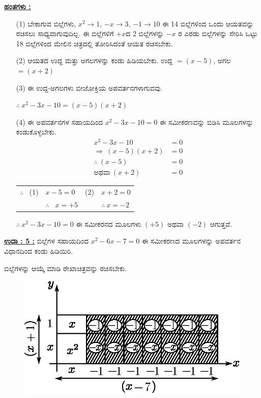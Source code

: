 \noindent
{\textbf{\underline{ಹಂತಗಳು :}}}
\begin{itemize}
\item [(1)] ಬೇಕಾಗುವ ಬಿಲ್ಲೆಗಳು, $x^2 \rightarrow 1$, $-x \rightarrow 3$, $-1 \rightarrow 10$ ಈ 14 ಬಿಲ್ಲೆ\break ಗಳಿಂದ ಒಂದು ಆಯತವನ್ನು ರಚಿಸಲು ಸಾಧ್ಯವಾಗುವುದಿಲ್ಲ. ಈ ಬಿಲ್ಲೆಗಳಿಗೆ $+x$ದ 2 ಬಿಲ್ಲೆಗಳನ್ನು  $-x$ ರ ಎರಡು ಬಿಲ್ಲೆಗಳನ್ನು  ಸೇರಿಸಿ ಒಟ್ಟು 18 ಬಿಲ್ಲೆಗಳಿಂದ ಮೇಲಿನ ಚಿತ್ರದಲ್ಲಿ ತೋರಿಸಿದಂತೆ ಆಯತ ರಚಿಸಬೇಕು. 
\item [(2)] ಆಯತದ ಉದ್ದ ಮತ್ತು ಅಗಲಗಳನ್ನು ಕಂಡು ಹಿಡಿಯಬೇಕು. ಉದ್ದ $= (x - 5)$, ಅಗಲ $= (x + 2)$

\eject

\item [(3)] ಈ ಉದ್ದ-ಅಗಲಗಳು ಬೀಜೋಕ್ತಿಯ ಅಪವರ್ತನಗಳಾಗುವವು. 

$\therefore~ x^2 - 3x - 10 = (x-5)(x+2)$
\item [(4)] ಈ ಅಪವರ್ತನಗಳ ಸಹಾಯದಿಂದ $x^2 - 3x - 10 = 0$ ಈ ಸಮೀಕರಣವನ್ನು ಬಿಡಿಸಿ ಮೂಲಗಳನ್ನು ಕಂಡುಕೊಳ್ಳಬೇಕು. 
\begin{align*}
x^2 - 3x - 10 & = 0\\
\Rightarrow~ (x-5)(x+2) & = 0\\
\therefore~ (x-5) & = 0\tag{1}\\
\text{ಅಥವಾ}~ (x+2) & = 0\tag{2}
\end{align*}

\begin{tabular}{llll}
$\therefore$~ (1) & $x - 5 = 0$ & (2) & $x + 2 = 0$\\
& $\therefore$~ $x = +5$ & &$\therefore~ x = -2$
\end{tabular}

$\therefore~ x^2 - 3x - 10 = 0$ ಈ ಸಮೀಕರನದ ಮೂಲಗಳು $(+5)$ ಅಥವಾ $(-2)$ ಆಗುತ್ತವೆ. 
\end{itemize}

\noindent
{\textbf{\underline{ಉದಾ : 5 :}}} ಬಿಲ್ಲೆಗಳ ಸಹಾಯದಿಂದ $x^2 - 6x - 7 = 0$ ಈ ಸಮೀಕರಣದ ಮೂಲ\-ಗಳನ್ನು ಅಪವರ್ತನ ವಿಧಾನದಿಂದ ಕಂಡು ಹಿಡಿಯಿರಿ. 

ಬಿಲ್ಲೆಗಳನ್ನು ಆಯ್ಕೆ ಮಾಡಿ ರೇಖಾಚಿತ್ರವನ್ನು ರಚಿಸಬೇಕು.
\begin{figure}[H]
\centering
\includegraphics[scale=0.8]{src/figure/chap3/fig3-55b.eps}
\end{figure}


